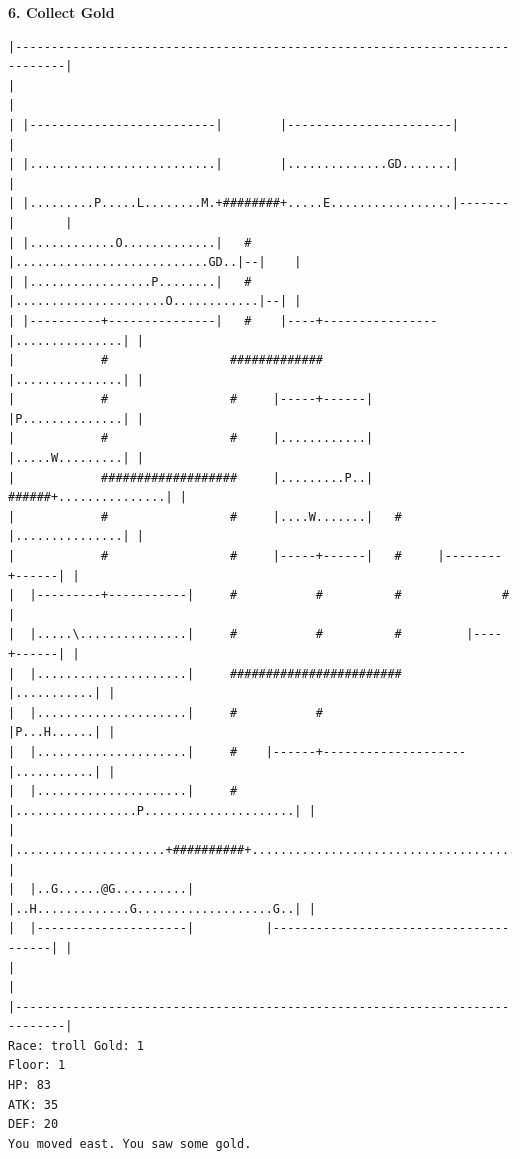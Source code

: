 \documentclass[11pt]{article}
\theoremstyle{plain}
\begin{document}
\newpage
\textbf{6. Collect Gold}

\begin{Verbatim}[fontsize=\scriptsize]
|-----------------------------------------------------------------------------|
|                                                                             |
| |--------------------------|        |-----------------------|               |
| |..........................|        |..............GD.......|               |
| |.........P.....L........M.+########+.....E.................|-------|       |
| |............O.............|   #    |...........................GD..|--|    |
| |.................P........|   #    |.....................O............|--| |
| |----------+---------------|   #    |----+----------------|...............| |
|            #                 #############                |...............| |
|            #                 #     |-----+------|         |P..............| |
|            #                 #     |............|         |.....W.........| |
|            ###################     |.........P..|   ######+...............| |
|            #                 #     |....W.......|   #     |...............| |
|            #                 #     |-----+------|   #     |--------+------| |
|  |---------+-----------|     #           #          #              #        |
|  |.....\...............|     #           #          #         |----+------| |
|  |.....................|     ########################         |...........| |
|  |.....................|     #           #                    |P...H......| |
|  |.....................|     #    |------+--------------------|...........| |
|  |.....................|     #    |.................P.....................| |
|  |.....................+##########+.......................................| |
|  |..G......@G..........|          |..H.............G...................G..| |
|  |---------------------|          |---------------------------------------| |
|                                                                             |
|-----------------------------------------------------------------------------|
Race: troll Gold: 1                                                    Floor: 1
HP: 83
ATK: 35
DEF: 20
You moved east. You saw some gold. 
\end{Verbatim}
\end{document}
